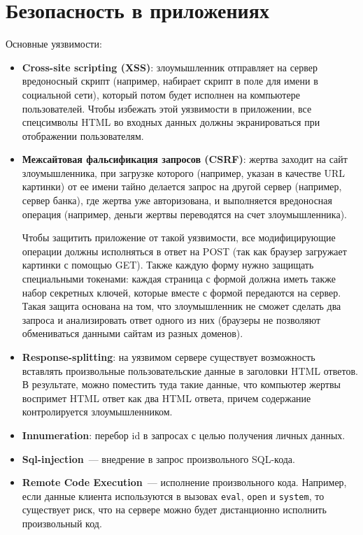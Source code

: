 \section{Безопасность в приложениях} %
Основные уязвимости:
\begin{itemize}
  \item \textbf{Cross-site scripting (XSS)}: злоумышленник отправляет на сервер вредоносный скрипт (например, набирает скрипт в поле для имени в социальной сети), который потом будет исполнен на компьютере пользователей.
Чтобы избежать этой уязвимости в приложении, все спецсимволы HTML во входных данных должны экранироваться при отображении пользователям.

  \item \textbf{Межсайтовая фальсификация запросов (CSRF)}: жертва заходит на сайт злоумышленника, при загрузке которого (например, указан в качестве URL картинки) от ее имени тайно делается запрос на другой сервер (например, сервер банка), где жертва уже авторизована, и выполняется вредоносная операция (например, деньги жертвы переводятся на счет злоумышленника).

  Чтобы защитить приложение от такой уязвимости, все модифицирующие операции должны исполняться в ответ на POST (так как браузер загружает картинки с помощью GET). Также каждую форму нужно защищать специальными токенами: каждая страница с формой должна иметь также набор секретных ключей, которые вместе с формой передаются на сервер. Такая защита основана на том, что злоумышленник не сможет сделать два запроса и анализировать ответ одного из них (браузеры не позволяют обмениваться данными сайтам из разных доменов).

  \item \textbf{Response-splitting}: на уязвимом сервере существует возможность вставлять произвольные пользовательские данные в заголовки HTML ответов. В результате, можно поместить туда такие данные, что компьютер жертвы воспримет HTML ответ как два HTML ответа, причем содержание контролируется злоумышленником.

  \item \textbf{Innumeration}: перебор id в запросах с целью получения личных данных.
  \item \textbf{Sql-injection}~--- внедрение в запрос произвольного SQL-кода.
  \item \textbf{Remote Code Execution}~--- исполнение произвольного кода. Например, если данные клиента используются в вызовах \verb|eval|, \verb|open| и \verb|system|, то существует риск, что на сервере можно будет дистанционно исполнить произвольный код.
\end{itemize}
